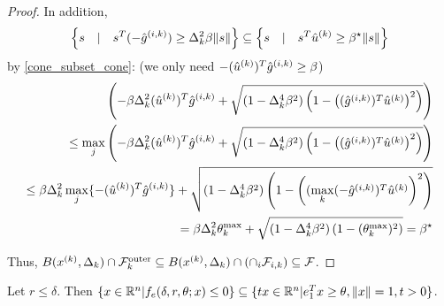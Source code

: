 \begin{proof}
In addition,
\begin{align*}
\left\{s\quad | \quad s^T(-{{\hat g}^{(i, k)}})\ge\Delta_k^2\beta\|s\| \right\}  \subseteq \left\{s\quad | \quad s^T{{\hat u}^{(k)}}\ge\beta^{\star}\|s\| \right\}
\end{align*}
by \cref{cone_subset_cone}: (\color{red}we only need $-({{\hat u}^{(k)}})^T{{\hat g}^{(i, k)}} \ge \beta$\color{black})
\begin{align*}
\left(-\beta\Delta_k^2({{\hat u}^{(k)}})^T{{\hat g}^{(i, k)}} + \sqrt{(1 - \Delta_k^4\beta^2)\left(1 - \left(({{\hat g}^{(i, k)}})^T\hat u^{(k)}\right)^2\right)}\right) \\
\le \max_j \left(-\beta\Delta_k^2({{\hat u}^{(k)}})^T{{{\hat g}^{(i, k)}}} + \sqrt{(1 - \Delta_k^4\beta^2)\left(1 - \left(({{\hat g}^{(i, k)}})^T{{\hat u}^{(k)}}\right)^2\right)}\right) \\
\le \beta\Delta_k^2 \max_j\{-({{\hat u}^{(k)}})^T{{\hat g}^{(i, k)}}\} + \sqrt{(1 - \Delta_k^4\beta^2)\left(1 - \left((\max_k(-{{\hat g}^{(i, k)}})^T{{\hat u}^{(k)}}\right)^2\right)} \\
= \beta\Delta_k^2 \theta^{\text{max}}_k + \sqrt{(1 - \Delta_k^4\beta^2)\left(1 - (\theta^{\text{max}}_k) ^2\right)} = \beta^{\star}
\end{align*}

Thus, $B({x^{(k)}}, \Delta_k) \cap {\mathcal {F}^{\text{outer}}_k} \subseteq B({x^{(k)}}, \Delta_k) \cap \left(\cap_i {\mathcal F_{i, k}} \right)\subseteq {\mathcal F}$.
\end{proof}


\begin{theorem}
Let $r \le \delta$.
Then $\{x \in {\mathbb R^{n}} | f_e(\delta, r, \theta; x) \le 0\} \subseteq \{tx\in{\mathbb R^{n}}| e_1^T x \ge \theta,\|x\|=1, t>0\}$.
\end{theorem}





